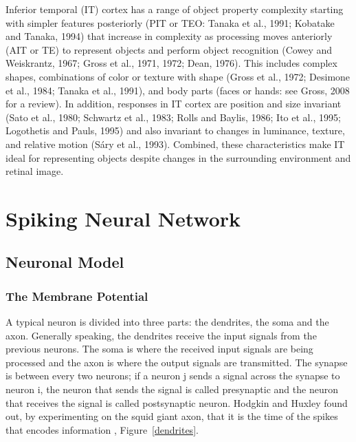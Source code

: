 Inferior temporal (IT) cortex has a range of object property complexity starting with simpler features posteriorly (PIT or TEO: Tanaka et al., 1991; Kobatake and Tanaka, 1994) that increase in complexity as processing moves anteriorly (AIT or TE) to represent objects and perform object recognition (Cowey and Weiskrantz, 1967; Gross et al., 1971, 1972; Dean, 1976).
This includes complex shapes, combinations of color or texture with shape (Gross et al., 1972; Desimone et al., 1984; Tanaka et al., 1991), and body parts (faces or hands: see Gross, 2008 for a review). 
In addition, responses in IT cortex are position and size invariant (Sato et al., 1980; Schwartz et al., 1983; Rolls and Baylis, 1986; Ito et al., 1995; Logothetis and Pauls, 1995) and also invariant to changes in luminance, texture, and relative motion (Sáry et al., 1993).
Combined, these characteristics make IT ideal for representing objects despite changes in the surrounding environment and retinal image.

%

\section{Spiking Neural Network}
\label{sec:pgr}
\subsection{Neuronal Model}
\subsubsection{The Membrane Potential}
A typical neuron is divided into three parts: the dendrites, the soma and the axon. Generally speaking, the dendrites receive the input signals from the previous neurons. The soma is where the received input signals are being processed and the axon is where the output signals are transmitted. The synapse is between every two neurons; if a neuron j sends a signal across the synapse to neuron i, the neuron that sends the signal is called presynaptic and the neuron that receives the signal is called postsynaptic neuron. 
Hodgkin and Huxley \cite{hhmodel} found out, by experimenting on the squid giant axon, that it is the time of the spikes that encodes information \cite{pnn}, Figure~\ref{dendrites}.
 
